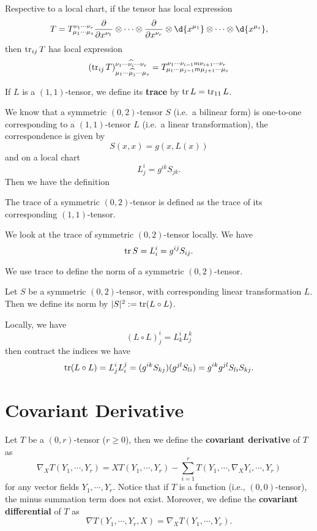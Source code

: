 Respective to a local chart, if the tensor has local expression
\[T=T_{\mu_1\cdots\mu_s}^{\nu_1\cdots\nu_r}\frac{\partial{}}{\partial{x^{\nu_1}}}\otimes\cdots\otimes\frac{\partial{}}{\partial{x^{\nu_r}}}\otimes\d{x^{\mu_1}}\otimes\cdots\otimes\d{x^{\mu_s}},\]
then $\operatorname{tr}_{ij}T$ has local expression
\[(\operatorname{tr}_{ij}T)_{\mu_1\cdots\widehat{\mu_{j}}\cdots\mu_s}^{\nu_1\cdots\widehat{\nu_{i}}\cdots\nu_r}=T_{\mu_1\cdots\mu_{j-1}m\mu_{j+1}\cdots\mu_s}^{\nu_1\cdots\nu_{i-1}m\nu_{i+1}\cdots\nu_r}\]

\begin{defn}
    If $L$ is a $(1,1)$-tensor, we define its \textbf{trace} by $\operatorname{tr}{L}=\operatorname{tr}_{11}L$.
\end{defn}

We know that a symmetric $(0,2)$-tensor $S$ (i.e.\ a bilinear form) is one-to-one corresponding to a $(1,1)$-tensor $L$ (i.e.\ a linear transformation), the correspondence is given by
\[S(x,x)=g(x,L(x))\]
and on a local chart
\[L^i_j=g^{ik}S_{jk}.\]
Then we have the definition

\begin{defn}
    The trace of a symmetric $(0,2)$-tensor is defined as the trace of its corresponding $(1,1)$-tensor.
\end{defn}

We look at the trace of symmetric $(0,2)$-tensor locally.
We have
\[\operatorname{tr}{S}=L^i_i=g^{ij}S_{ij}.\]

We use trace to define the norm of a symmetric $(0,2)$-tensor.
\begin{defn}
    Let $S$ be a symmetric $(0,2)$-tensor, with corresponding linear transformation $L$.
    Then we define its norm by $|S|^2:=\operatorname{tr}(L\circ L)$.
\end{defn}

Locally, we have
\[(L\circ L)^i_j=L^i_kL^k_j\]
then contract the indices we have
\[\operatorname{tr}(L\circ L)=L^i_jL^j_i=(g^{ik}S_{kj})(g^{jl}S_{li})=g^{ik}g^{jl}S_{li}S_{kj}.\]

\section{Covariant Derivative}

\begin{defn}
    Let $T$ be a $(0,r)$-tensor ($r\geq 0$), then we define the \textbf{covariant derivative} of $T$ as
    \[\nabla_XT(Y_1,\cdots,Y_r)=XT(Y_1,\cdots,Y_r)-\sum_{i=1}^rT(Y_1,\cdots,\nabla_XY_i,\cdots,Y_r)\]
    for any vector fields $Y_1,\cdots,Y_r$.
    Notice that if $T$ is a function (i.e., $(0,0)$-tensor), the minus summation term does not exist.
    Moreover, we define the \textbf{covariant differential} of $T$ as
    \[\nabla T(Y_1,\cdots,Y_r,X)=\nabla_XT(Y_1,\cdots,Y_r).\]
\end{defn}

